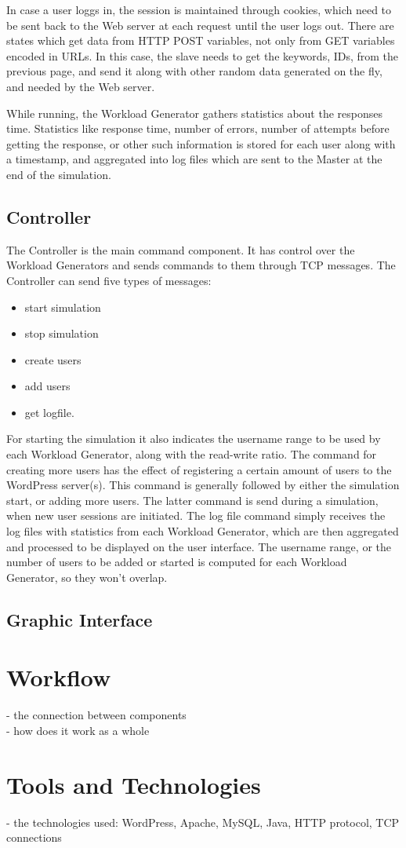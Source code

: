 In case a user loggs in, the session is maintained through cookies, which need to be sent back to the Web server at each request until the user logs out. There are states which get data from HTTP POST variables, not only from GET variables encoded in URLs. In this case, the slave needs to get the keywords, IDs, from the previous page, and send it along with other random data generated on the fly, and needed by the Web server. 

While running, the Workload Generator gathers statistics about the responses time. Statistics like response time, number of errors, number of attempts before getting the response, or other such information is stored for each user along with a timestamp, and aggregated into log files which are sent to the Master at the end of the simulation.

\subsection{Controller}
\label{sub-sec:controller}

The Controller is the main command component. It has control over the Workload Generators and sends commands to them through TCP messages. The Controller can send five types of messages:
\begin{itemize}
 \item start simulation
 \item stop simulation
 \item create users
 \item add users
 \item get logfile.
\end{itemize}

For starting the simulation it also indicates the username range to be used by each Workload Generator, along with the read-write ratio. The command for creating more users has the effect of registering a certain amount of users to the WordPress server(s). This command is generally followed by either the simulation start, or adding more users. The latter command is send during a simulation, when new user sessions are initiated. The log file command simply receives the log files with statistics from each Workload Generator, which are then aggregated and processed to be displayed on the user interface. The username range, or the number of users to be added or started is computed for each Workload Generator, so they won't overlap.

\subsection{Graphic Interface}
\label{sub-sec:graphic-interface}


\section{Workflow}
\label{sec:workflow}

- the connection between components\\
- how does it work as a whole


\section{Tools and Technologies}
\label{sec:tools-and-technologies}

- the technologies used: WordPress, Apache, MySQL, Java, HTTP protocol, TCP connections